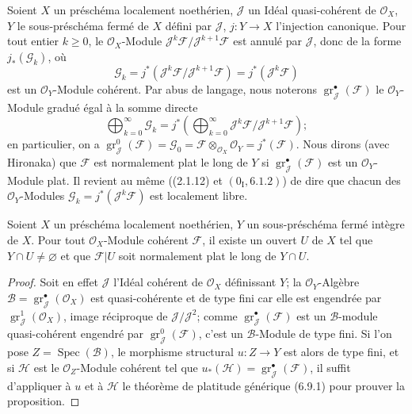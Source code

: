\begin{env}[6.10.1]
\label{IV.2.s6.10.1-fr}
Soient $X$ un préschéma localement noethérien, $\mathcal J$ un Idéal
quasi-cohérent de $\mathcal O_X$, $Y$ le sous-préschéma fermé de $X$ défini
par $\mathcal J$, $j:Y\to X$ l'injection canonique. Pour tout entier $k\geq0$,
le $\mathcal O_X$-Module
$\mathcal J^k\mathcal F/\mathcal J^{k+1}\mathcal F$ est annulé par
$\mathcal J$, donc de la forme $j_*(\mathcal G_k)$, où
\[
\mathcal G_k=j^*(\mathcal J^k\mathcal F/\mathcal J^{k+1}\mathcal F)
=j^*(\mathcal J^k\mathcal F)
\]
est un $\mathcal O_Y$-Module cohérent. Par abus de langage, nous noterons
$\operatorname{gr}_{\mathcal J}^{\bullet}(\mathcal F)$ le
$\mathcal O_Y$-Module gradué égal à la somme directe
\[
\bigoplus_{k=0}^{\infty}\mathcal G_k
=j^*\left(\bigoplus_{k=0}^{\infty}
\mathcal J^k\mathcal F/\mathcal J^{k+1}\mathcal F\right);
\]
en particulier, on a
$\operatorname{gr}_{\mathcal J}^{0}(\mathcal F)=\mathcal G_0
=\mathcal F\otimes_{\mathcal O_X}\mathcal O_Y=j^*(\mathcal F)$. Nous dirons
(avec Hironaka) que $\mathcal F$ est normalement plat le long de $Y$ si
$\operatorname{gr}_{\mathcal J}^{\bullet}(\mathcal F)$ est un
$\mathcal O_Y$-Module plat. Il revient au même ((2.1.12) et
$(0_{\mathrm I},6.1.2)$) de dire que chacun des $\mathcal O_Y$-Modules
$\mathcal G_k=j^*(\mathcal J^k\mathcal F)$ est localement libre.
\end{env}

\begin{proposition}[6.10.2]
\label{IV.2.s6.10.2-fr}
Soient $X$ un préschéma localement noethérien, $Y$ un sous-préschéma fermé
intègre de $X$. Pour tout $\mathcal O_X$-Module cohérent $\mathcal F$, il
existe un ouvert $U$ de $X$ tel que $Y\cap U\ne\varnothing$ et que
$\mathcal F|U$ soit normalement plat le long de $Y\cap U$.
\end{proposition}

\begin{proof}
Soit en effet $\mathcal J$ l'Idéal cohérent de $\mathcal O_X$ définissant
$Y$; la $\mathcal O_Y$-Algèbre
$\mathcal B=\operatorname{gr}_{\mathcal J}^{\bullet}(\mathcal O_X)$ est
quasi-cohérente et de type fini car elle est engendrée par
$\operatorname{gr}_{\mathcal J}^{1}(\mathcal O_X)$, image réciproque de
$\mathcal J/\mathcal J^2$; comme
$\operatorname{gr}_{\mathcal J}^{\bullet}(\mathcal F)$ est un
$\mathcal B$-module quasi-cohérent engendré par
$\operatorname{gr}_{\mathcal J}^{0}(\mathcal F)$, c'est un
$\mathcal B$-Module de type fini. Si l'on pose
$Z=\operatorname{Spec}(\mathcal B)$, le morphisme structural $u:Z\to Y$ est
alors de type fini, et si $\mathcal H$ est le $\mathcal O_Z$-Module cohérent
tel que $u_*(\mathcal H)=\operatorname{gr}_{\mathcal J}^{\bullet}(\mathcal F)$,
il suffit d'appliquer à $u$ et à $\mathcal H$ le théorème de platitude
générique (6.9.1) pour prouver la proposition.
\end{proof}

